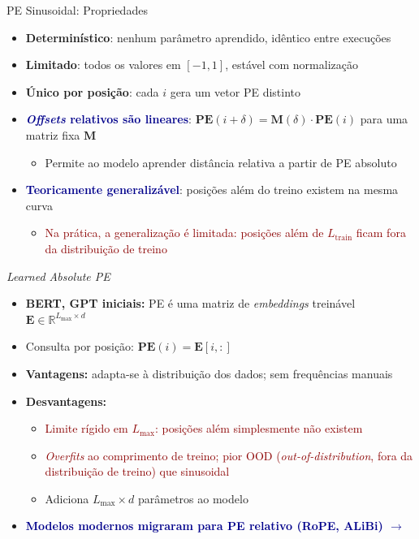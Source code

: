 \documentclass[aspectratio=169, xcolor=dvipsnames]{beamer}
\begin{document}
  \begin{frame}{PE Sinusoidal: Propriedades}
    \begin{itemize}
      \item \textbf{Determinístico}: nenhum parâmetro aprendido, idêntico entre execuções
      \item \textbf{Limitado}: todos os valores em $[-1, 1]$, estável com normalização
      \item \textbf{Único por posição}: cada $i$ gera um vetor PE distinto
      \item \textcolor{DarkBlue}{\textbf{\textit{Offsets} relativos são lineares}}: $\mathbf{PE}(i+\delta) = \mathbf{M}(\delta) \cdot \mathbf{PE}(i)$ para uma matriz fixa $\mathbf{M}$
        \begin{itemize}
          \item Permite ao modelo aprender distância relativa a partir de PE absoluto
        \end{itemize}
      \item \textcolor{DarkBlue}{\textbf{Teoricamente generalizável}}: posições além do treino existem na mesma curva
        \begin{itemize}
          \item \textcolor{DarkRed}{Na prática, a generalização é limitada: posições além de $L_{\text{train}}$ ficam fora da distribuição de treino}
        \end{itemize}
    \end{itemize}
  \end{frame}

  \begin{frame}{\textit{Learned Absolute PE}}
    \begin{itemize}
      \item \textbf{BERT, GPT iniciais:} PE é uma matriz de \textit{embeddings} treinável $\mathbf{E} \in \mathbb{R}^{L_{\max} \times d}$
      \item Consulta por posição: $\mathbf{PE}(i) = \mathbf{E}[i, :]$
      \item \textbf{Vantagens:} adapta-se à distribuição dos dados; sem frequências manuais
      \item \textbf{Desvantagens:}
        \begin{itemize}
          \item \textcolor{DarkRed}{Limite rígido em $L_{\max}$: posições além simplesmente não existem}
          \item \textcolor{DarkRed}{\textit{Overfits} ao comprimento de treino; pior OOD (\textit{out-of-distribution}, fora da distribuição de treino) que sinusoidal}
          \item Adiciona $L_{\max} \times d$ parâmetros ao modelo
        \end{itemize}
      \item \textcolor{DarkBlue}{\textbf{Modelos modernos migraram para PE relativo (RoPE, ALiBi) $\to$}}
    \end{itemize}
  \end{frame}
\end{document}
